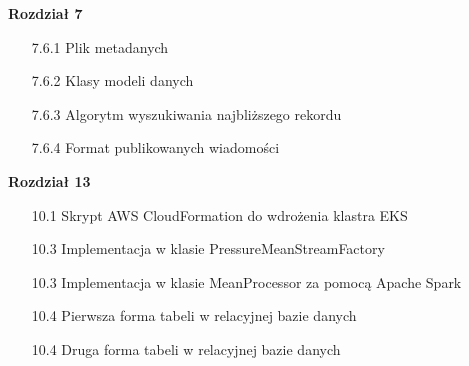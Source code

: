 \documentclass[12pt]{przejsciowka}
\begin{document}
    \vspace{10pt}
    \noindent\textbf{Rozdział 7}
    \begin{itemize}
        \item[7.6.1] Plik metadanych \dotfill \pageref{lst:plik_metadanych}
        \item[7.6.2] Klasy modeli danych \dotfill \pageref{lst:klasy_modeli_danych}
        \item[7.6.3] Algorytm wyszukiwania najbliższego rekordu \dotfill \pageref{lst:algorytm_wyszukiwania_rekordu}
        \item[7.6.4] Format publikowanych wiadomości \dotfill \pageref{lst:format_publikowanych_wiadomosci}
    \end{itemize}

    \vspace{10pt}
    \noindent\textbf{Rozdział 13}
    \begin{itemize}
        \item[10.1] Skrypt AWS CloudFormation do wdrożenia klastra EKS \dotfill \pageref{lst:eks_cloudformation}
        \item[10.3] Implementacja w klasie PressureMeanStreamFactory \dotfill \pageref{lst:pressure_mean_stream_factory}
        \item[10.3] Implementacja w klasie MeanProcessor za pomocą Apache Spark \dotfill \pageref{lst:mean_processor_spark}
        \item[10.4] Pierwsza forma tabeli w relacyjnej bazie danych \dotfill \pageref{lst:first_form_table}
        \item[10.4] Druga forma tabeli w relacyjnej bazie danych \dotfill \pageref{lst:second_form_table}
    \end{itemize}

    \endgroup
    \clearpage

    
\end{document}
